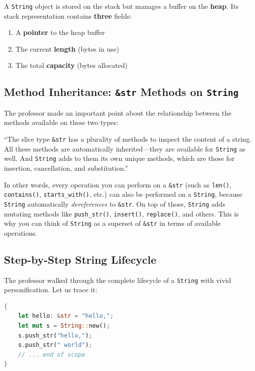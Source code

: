 A \texttt{String} object is stored on the stack but manages a buffer on the \textbf{heap}. Its stack representation contains \textbf{three} fields:
\begin{enumerate}
    \item A \textbf{pointer} to the heap buffer
    \item The current \textbf{length} (bytes in use)
    \item The total \textbf{capacity} (bytes allocated)
\end{enumerate}

\subsection{Method Inheritance: \texttt{\&str} Methods on \texttt{String}}

The professor made an important point about the relationship between the methods available on these two types:

\begin{insightbox}
``The slice type \texttt{\&str} has a plurality of methods to inspect the content of a string. All these methods are automatically inherited---they are available for \texttt{String} as well. And \texttt{String} adds to them its own unique methods, which are those for insertion, cancellation, and substitution.''
\end{insightbox}

In other words, every operation you can perform on a \texttt{\&str} (such as \texttt{len()}, \texttt{contains()}, \texttt{starts\_with()}, etc.) can also be performed on a \texttt{String}, because \texttt{String} automatically \emph{dereferences} to \texttt{\&str}. On top of those, \texttt{String} adds mutating methods like \texttt{push\_str()}, \texttt{insert()}, \texttt{replace()}, and others. This is why you can think of \texttt{String} as a superset of \texttt{\&str} in terms of available operations.

\subsection{Step-by-Step String Lifecycle}

The professor walked through the complete lifecycle of a \texttt{String} with vivid personification. Let us trace it:

\begin{lstlisting}[language=Rust]
{
    let hello: &str = "hello,";
    let mut s = String::new();
    s.push_str("hello,");
    s.push_str(" world");
    // ... end of scope
}
\end{lstlisting}

